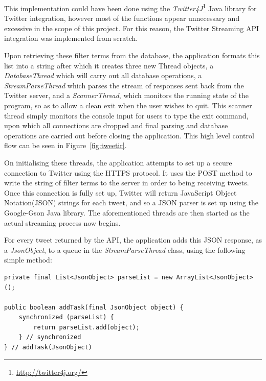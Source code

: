 This implementation could have been done using the \emph{Twitter4J}\footnote{\url{http://twitter4j.org/}} Java library for Twitter integration, however most of the functions appear unnecessary and excessive in the scope of this project. For this reason, the Twitter Streaming API integration was implemented from scratch.

Upon retrieving these filter terms from the database, the application formats this list into a string after which it creates three new Thread objects, a \emph{DatabaseThread} which will carry out all database operations, a \emph{StreamParseThread} which parses the stream of responses sent back from the Twitter server, and a \emph{ScannerThread}, which monitors the running state of the program, so as to allow a clean exit when the user wishes to quit. This scanner thread simply monitors the console input for users to type the exit command, upon which all connections are dropped and final parsing and database operations are carried out before closing the application. This high level control flow can be seen in Figure~\ref{fig:tweetir}.

On initialising these threads, the application attempts to set up a secure connection to Twitter using the HTTPS protocol. It uses the POST method to write the string of filter terms to the server in order to being receiving tweets. Once this connection is fully set up, Twitter will return JavaScript Object Notation(JSON) strings for each tweet, and so a JSON parser is set up using the Google-Gson Java library\cite{gson}. The aforementioned threads are then started as the actual streaming process now begins.

For every tweet returned by the API, the application adds this JSON response, as a \emph{JsonObject}, to a queue in the \emph{StreamParseThread} class, using the following simple method:
\begin{lstlisting}[caption=Adding tweets to a parse queue, label=lst:queue]
private final List<JsonObject> parseList = new ArrayList<JsonObject>();

public boolean addTask(final JsonObject object) {
    synchronized (parseList) {
        return parseList.add(object);
    } // synchronized
} // addTask(JsonObject)
\end{lstlisting}

